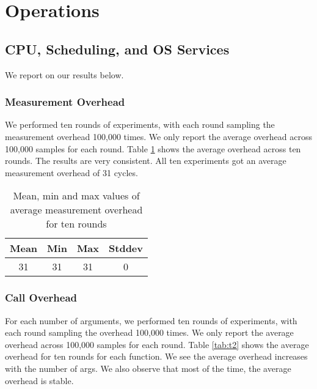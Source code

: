 \section{Operations}

\subsection{CPU, Scheduling, and OS Services}
We report on our results below.
\subsubsection{Measurement Overhead}
We performed ten rounds of experiments, with each round sampling the measurement overhead 100,000 times. We only report the average overhead across 100,000 samples for each round.
Table \ref{tab:t1} shows the average overhead across ten rounds. 
The results are very consistent.
All ten experiments got an average measurement overhead of 31 cycles.

\begin{table}[htb]

\caption{Mean, min and max values of average measurement overhead for ten rounds}

    \begin{tabular}{|c|c|c|c|} 
     \hline
     Mean & Min & Max & Stddev\\ 
     \hline
     31 & 31 & 31 & 0\\ 
     \hline
    \end{tabular}
    \label{tab:t1}
\end{table}

\subsubsection{Call Overhead}
For each number of arguments, we performed ten rounds of experiments,
with each round sampling the overhead 100,000 times.
%
We only report the average overhead across 100,000 samples for each
round.
%
Table \ref{tab:t2} shows the average overhead for ten rounds for each
function.
%
We see the average overhead increases with the number of args. We also
observe that most of the time, the average overhead is stable.

